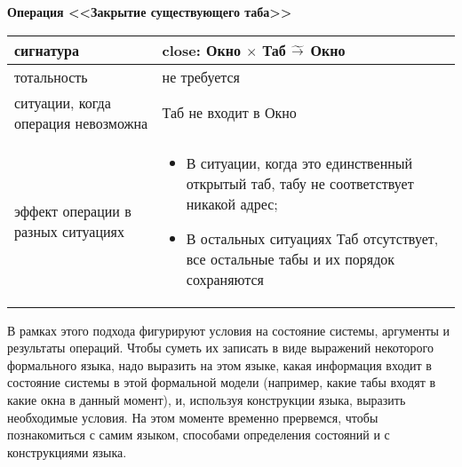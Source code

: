 \documentclass[14pt, twoside]{extreport}
\begin{document}
{\textbf{Операция <<Закрытие существующего таба>>}

\begin{tabular}{|p{}|p{}|}
  \hline
  сигнатура & close: Окно $\times$ Таб $\widetilde{\rightarrow}$ Окно \\ \hline
  тотальность & не требуется \\ \hline
  ситуации, когда операция невозможна & Таб не входит в Окно \\ \hline
  эффект операции в разных ситуациях & \begin{itemize}\item В ситуации, когда это единственный открытый таб, табу не соответствует никакой адрес;\item В остальных ситуациях Таб отсутствует, все остальные табы и их порядок сохраняются \end{itemize} \\ \hline
\end{tabular}
}

В рамках этого подхода фигурируют условия на состояние системы, аргументы и результаты операций. Чтобы суметь их записать в виде выражений некоторого формального языка, надо выразить на этом языке, какая информация входит в состояние системы в этой формальной модели (например, какие табы входят в какие окна в данный момент), и, используя конструкции языка, выразить необходимые условия. На этом моменте временно прервемся, чтобы познакомиться с самим языком, способами определения состояний и с конструкциями языка.
\end{document}

